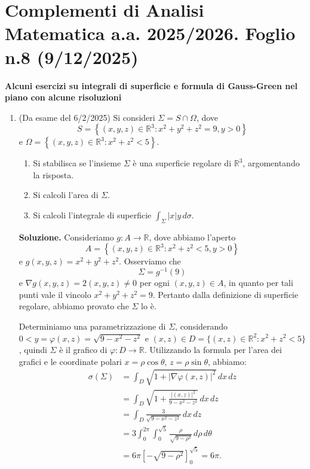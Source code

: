 \section{Complementi di Analisi Matematica a.a. 2025/2026. Foglio n.8 (9/12/2025)}

\textbf{Alcuni esercizi su integrali di superficie e formula di Gauss-Green nel piano con alcune risoluzioni}

\begin{enumerate}
	\item (Da esame del 6/2/2025) Si consideri $\Sigma = S \cap \Omega$, dove
	\[
	S = \left\{(x,y,z) \in \mathbb{R}^3 : x^2 + y^2 + z^2 = 9, y > 0\right\}
	\]
	e $\Omega = \left\{(x,y,z) \in \mathbb{R}^3 : x^2 + z^2 < 5\right\}$.
	\begin{enumerate}
		\item Si stabilisca se l'insieme $\Sigma$ è una superficie regolare di $\mathbb{R}^3$, argomentando la risposta.
		\item Si calcoli l'area di $\Sigma$.
		\item Si calcoli l'integrale di superficie $\int_{\Sigma} |x| y \, d\sigma$.
	\end{enumerate}
	
	\textbf{Soluzione.}
		Consideriamo $g: A \to \mathbb{R}$, dove abbiamo l'aperto
		\[
		A = \left\{(x,y,z) \in \mathbb{R}^3 : x^2 + z^2 < 5, y > 0\right\}
		\]
		e $g(x,y,z) = x^2 + y^2 + z^2$. Osserviamo che
		\[
		\Sigma = g^{-1}(9)
		\]
		e $\nabla g(x,y,z) = 2(x,y,z) \neq 0$ per ogni $(x,y,z) \in A$, in quanto per tali punti vale il vincolo $x^2 + y^2 + z^2 = 9$. Pertanto dalla definizione di superficie regolare, abbiamo provato che $\Sigma$ lo è.
		
		Determiniamo una parametrizzazione di $\Sigma$, considerando $0 < y = \varphi(x,z) = \sqrt{9 - x^2 - z^2}$ e $(x,z) \in D = \{(x,z) \in \mathbb{R}^2 : x^2 + z^2 < 5\}$, quindi $\Sigma$ è il grafico di $\varphi: D \to \mathbb{R}$. Utilizzando la formula per l'area dei grafici e le coordinate polari $x = \rho \cos \theta$, $z = \rho \sin \theta$, abbiamo:
		\[
		\begin{aligned}
			\sigma(\Sigma) &= \int_D \sqrt{1 + |\nabla \varphi(x,z)|^2} \, dx \, dz \\
			&= \int_D \sqrt{1 + \frac{|(x,z)|^2}{9 - x^2 - z^2}} \, dx \, dz \\
			&= \int_D \frac{3}{\sqrt{9 - x^2 - z^2}} \, dx \, dz \\
			&= 3 \int_0^{2\pi} \int_0^{\sqrt{5}} \frac{\rho}{\sqrt{9 - \rho^2}} \, d\rho \, d\theta \\
			&= 6\pi \left[-\sqrt{9 - \rho^2}\right]_0^{\sqrt{5}} = 6\pi.
		\end{aligned}
		\]
		

\end{enumerate}
